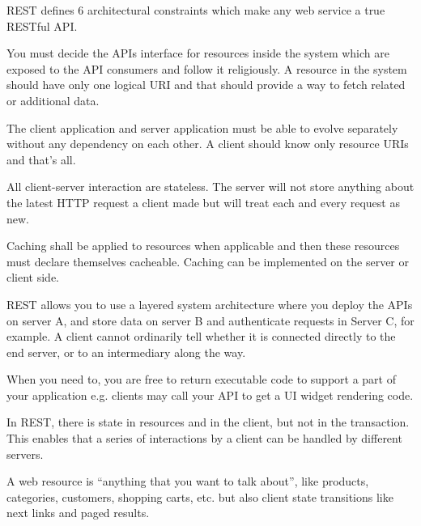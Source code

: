 \begin{mytitle} REST defines 6 architectural constraints which make any web service a true RESTful API. 
    \begin{mysubtitle}  You must decide the APIs interface for resources inside the system which are exposed to the API consumers and follow it religiously. A resource in the system should have only one logical URI and that should provide a way to fetch related or additional data.
    \end{mysubtitle}
    \begin{mysubtitle}  The client application and server application must be able to evolve separately without any dependency on each other. A client should know only resource URIs and that’s all. 
    \end{mysubtitle}
    \begin{mysubtitle} [Stateless] All client-server interaction are stateless. The server will not store anything about the latest HTTP request a client made but will treat each and every request as new.
    \end{mysubtitle}
    \begin{mysubtitle} [Cacheable] Caching shall be applied to resources when applicable and then these resources must declare themselves cacheable. Caching can be implemented on the server or client side.
    \end{mysubtitle}
    \begin{mysubtitle}  REST allows you to use a layered system architecture where you deploy the APIs on server A, and store data on server B and authenticate requests in Server C, for example. A client cannot ordinarily tell whether it is connected directly to the end server, or to an intermediary along the way.
    \end{mysubtitle}
    \begin{mysubtitle}  When you need to, you are free to return executable code to support a part of your application e.g. clients may call your API to get a UI widget rendering code.
    \end{mysubtitle}
\end{mytitle}
\begin{myremark} In REST, there is state in resources and in the client, but not in the transaction. This enables that a series of interactions by a client can be handled by different servers.
\end{myremark}
\begin{mytitle} A web resource is ``anything that you want to talk about'', like products, categories, customers, shopping carts, etc. but also client state transitions like next links and paged results.
\end{mytitle}
